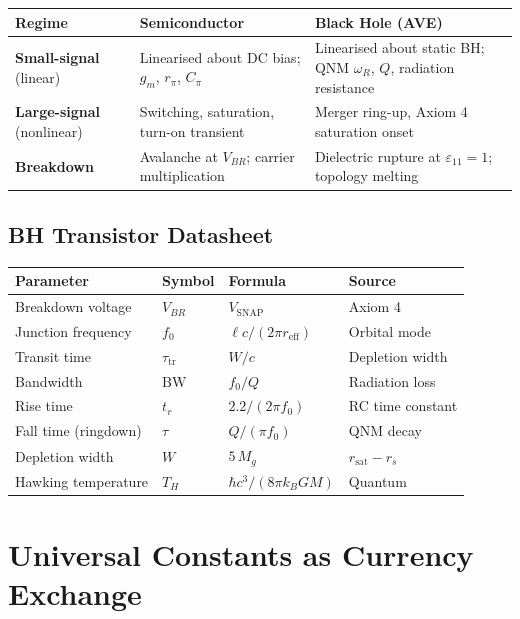 \begin{center}
\renewcommand{\arraystretch}{1.3}
\begin{tabular}{l p{5cm} p{5cm}}
\toprule
\textbf{Regime} & \textbf{Semiconductor} & \textbf{Black Hole (AVE)} \\
\midrule
\textbf{Small-signal} (linear) &
  Linearised about DC bias; $g_m$, $r_\pi$, $C_\pi$ &
  Linearised about static BH; QNM $\omega_R$, $Q$, radiation resistance \\
\textbf{Large-signal} (nonlinear) &
  Switching, saturation, turn-on transient &
  Merger ring-up, Axiom 4 saturation onset \\
\textbf{Breakdown} &
  Avalanche at $V_{BR}$; carrier multiplication &
  Dielectric rupture at $\varepsilon_{11} = 1$; topology melting \\
\bottomrule
\end{tabular}
\end{center}

\subsection{BH Transistor Datasheet}

\begin{center}
\renewcommand{\arraystretch}{1.3}
\begin{tabular}{l l l l}
\toprule
\textbf{Parameter} & \textbf{Symbol} & \textbf{Formula} & \textbf{Source} \\
\midrule
Breakdown voltage & $V_{BR}$ & $V_\mathrm{SNAP}$ & Axiom 4 \\
Junction frequency & $f_0$ & $\ell c / (2\pi r_\mathrm{eff})$ & Orbital mode \\
Transit time & $\tau_\mathrm{tr}$ & $W/c$ & Depletion width \\
Bandwidth & $\mathrm{BW}$ & $f_0 / Q$ & Radiation loss \\
Rise time & $t_r$ & $2.2 / (2\pi f_0)$ & RC time constant \\
Fall time (ringdown) & $\tau$ & $Q / (\pi f_0)$ & QNM decay \\
Depletion width & $W$ & $5\,M_g$ & $r_\mathrm{sat} - r_s$ \\
Hawking temperature & $T_H$ & $\hbar c^3/(8\pi k_B G M)$ & Quantum \\
\bottomrule
\end{tabular}
\end{center}


\section{Universal Constants as Currency Exchange}
\label{sec:currency_exchange_solver}

